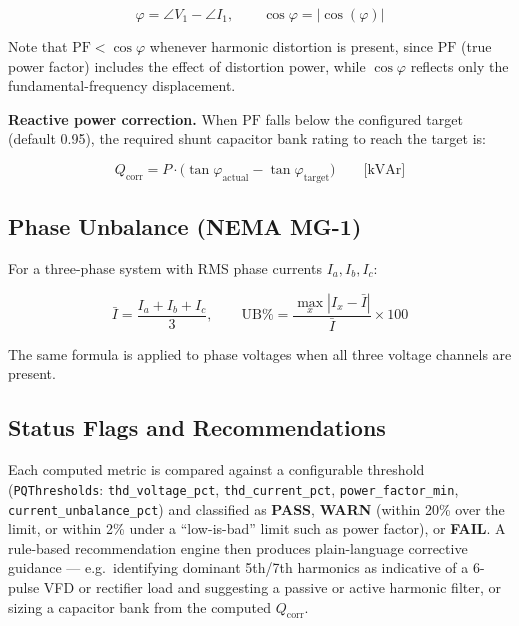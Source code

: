 \documentclass[11pt,a4paper]{article}
\newcommand{\code}[1]{\texttt{#1}}
\begin{document}
\begin{equation}
\varphi = \angle V_1 - \angle I_1, \qquad \cos\varphi = |\cos(\varphi)|
\end{equation}

Note that $\mathrm{PF} < \cos\varphi$ whenever harmonic distortion is
present, since $\mathrm{PF}$ (true power factor) includes the effect of
distortion power, while $\cos\varphi$ reflects only the fundamental-frequency
displacement.

\textbf{Reactive power correction.} When $\mathrm{PF}$ falls below the
configured target (default 0.95), the required shunt capacitor bank rating
to reach the target is:

\begin{equation}
Q_{\mathrm{corr}} = P \cdot \big(\tan\varphi_{\mathrm{actual}} - \tan\varphi_{\mathrm{target}}\big)
\qquad \text{[kVAr]}
\end{equation}

\subsection{Phase Unbalance (NEMA MG-1)}

For a three-phase system with RMS phase currents $I_a, I_b, I_c$:

\begin{equation}
\bar{I} = \frac{I_a + I_b + I_c}{3}, \qquad
\mathrm{UB\%} = \frac{\max_x |I_x - \bar{I}|}{\bar{I}} \times 100
\end{equation}

The same formula is applied to phase voltages when all three voltage
channels are present.

\subsection{Status Flags and Recommendations}

Each computed metric is compared against a configurable threshold
(\code{PQThresholds}: \code{thd\_voltage\_pct}, \code{thd\_current\_pct},
\code{power\_factor\_min}, \code{current\_unbalance\_pct}) and classified as
\textbf{PASS}, \textbf{WARN} (within 20\% over the limit, or within 2\% under
a ``low-is-bad'' limit such as power factor), or \textbf{FAIL}. A
rule-based recommendation engine then produces plain-language corrective
guidance --- e.g.\ identifying dominant 5th/7th harmonics as indicative of a
6-pulse VFD or rectifier load and suggesting a passive or active harmonic
filter, or sizing a capacitor bank from the computed $Q_{\mathrm{corr}}$.
\end{document}
